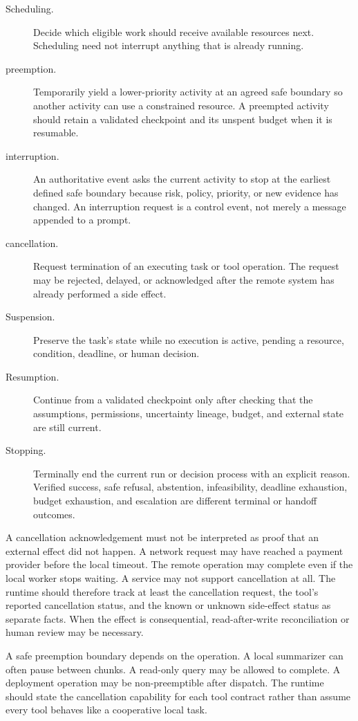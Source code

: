 \begin{description}
  \item[Scheduling.] Decide which eligible work should receive available resources next. Scheduling need not interrupt anything that is already running.
  \item[\gls{preemption}.] Temporarily yield a lower-priority activity at an agreed safe boundary so another activity can use a constrained resource. A preempted activity should retain a validated checkpoint and its unspent budget when it is resumable.
  \item[\gls{interruption}.] An authoritative event asks the current activity to stop at the earliest defined safe boundary because risk, policy, priority, or new evidence has changed. An \gls{interruption} request is a control event, not merely a message appended to a prompt.
  \item[\gls{cancellation}.] Request termination of an executing task or tool operation. The request may be rejected, delayed, or acknowledged after the remote system has already performed a side effect.
  \item[Suspension.] Preserve the task's state while no execution is active, pending a resource, condition, deadline, or human decision.
  \item[Resumption.] Continue from a validated checkpoint only after checking that the assumptions, permissions, uncertainty lineage, budget, and external state are still current.
  \item[Stopping.] Terminally end the current run or decision process with an explicit reason. Verified success, safe refusal, abstention, infeasibility, deadline exhaustion, budget exhaustion, and escalation are different terminal or handoff outcomes.
\end{description}

A \gls{cancellation} acknowledgement must not be interpreted as proof that an external effect did not happen. A network request may have reached a payment provider before the local timeout. The remote operation may complete even if the local worker stops waiting. A service may not support cancellation at all. The runtime should therefore track at least the cancellation request, the tool's reported cancellation status, and the known or unknown side-effect status as separate facts. When the effect is consequential, read-after-write reconciliation or human review may be necessary.

A safe preemption boundary depends on the operation. A local summarizer can often pause between chunks. A read-only query may be allowed to complete. A deployment operation may be non-preemptible after dispatch. The runtime should state the cancellation capability for each tool contract rather than assume every tool behaves like a cooperative local task.

